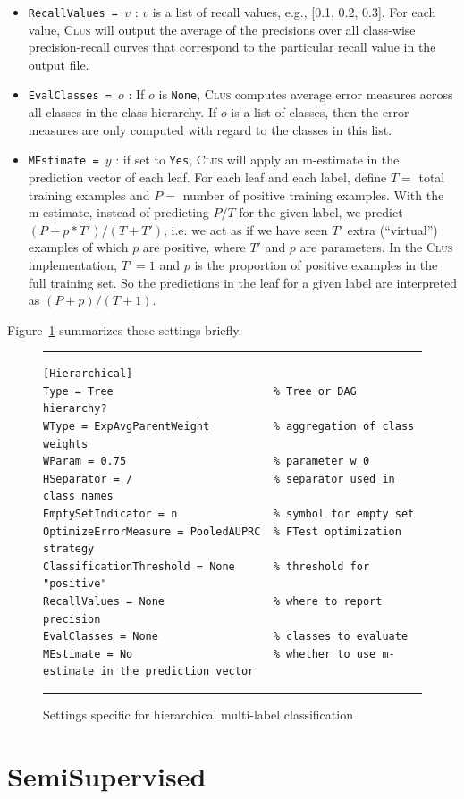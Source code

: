 \documentclass[a4paper]{report}
\newcommand{\clus}{\textsc{Clus}}
\begin{document}
\begin{itemize}
\item {\tt RecallValues = $v$} : $v$ is a list of recall values, e.g., [0.1, 0.2, 0.3]. For each value, \clus{} will output the average of the precisions over all class-wise precision-recall curves that correspond to the particular recall value in the output file.
\item {\tt EvalClasses = $o$} : If $o$ is {\tt None}, \clus{} computes average error measures across all classes in the class  hierarchy. If $o$ is a list of classes, then the error measures are only computed with regard to the classes in this list.
\item {\tt MEstimate = $y$} : if set to {\tt Yes}, \clus{} will apply an m-estimate in the prediction vector of each leaf. For each leaf and each label, define $T =$ total training examples and $P =$ number of positive training examples. With the m-estimate, instead of predicting $P/T$ for the given label, we predict $(P+p*T') /
(T+T')$, i.e. we act as if we have seen $T'$ extra (``virtual'') examples of
which $p$ are positive, where $T'$ and $p$ are parameters. In the \clus{}
implementation, $T'=1$ and $p$ is the proportion of positive examples in the full
training set. So the predictions in the leaf for a given label are interpreted as $(P+p) /
(T+1)$.

\end{itemize}
Figure~\ref{settings-hmc:fig} summarizes these settings briefly.

\begin{figure}[tb]
\hrule\vspace{1em}
\begin{verbatim}
[Hierarchical]
Type = Tree                         % Tree or DAG hierarchy?
WType = ExpAvgParentWeight          % aggregation of class weights
WParam = 0.75                       % parameter w_0
HSeparator = /                      % separator used in class names
EmptySetIndicator = n               % symbol for empty set
OptimizeErrorMeasure = PooledAUPRC  % FTest optimization strategy
ClassificationThreshold = None      % threshold for "positive"
RecallValues = None                 % where to report precision
EvalClasses = None                  % classes to evaluate
MEstimate = No                      % whether to use m-estimate in the prediction vector
\end{verbatim}
\hrule
\caption{Settings specific for hierarchical multi-label classification}
\label{settings-hmc:fig}
\end{figure}

%
\section{SemiSupervised}
\end{document}
